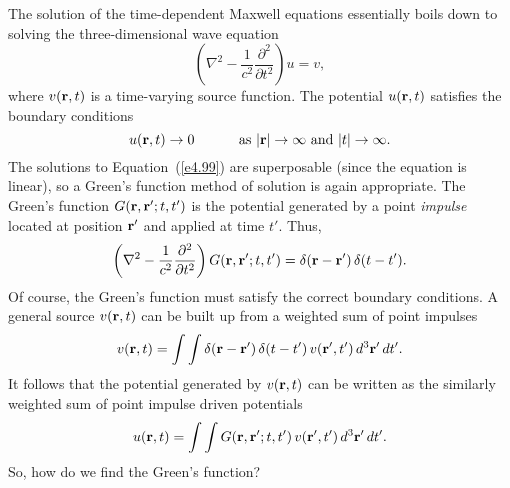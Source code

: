 The solution of the time-dependent Maxwell equations essentially
boils down to solving the three-dimensional wave equation
\begin{equation}\label{e4.99}
\left(\nabla^2 - \frac{1}{c^2}\frac{\partial^2}{\partial t^2}\right)u = v,
\end{equation}
where $v({\bf r}, t)$ is a time-varying source function. The potential $u({\bf r}, t)$
satisfies the boundary conditions
\begin{equation}
u({\bf r},t)\rightarrow 0 \mbox{\hspace{1cm} as $|{\bf r}|\rightarrow\infty$ and $|t|\rightarrow
\infty$.}
\end{equation}
The solutions to Equation~(\ref{e4.99}) are superposable (since the equation is linear), so
a Green's function method of solution is again appropriate. The Green's function
$G({\bf r}, {\bf r}'; t, t')$ is the potential generated by a point {\em impulse}\/ located at
position ${\bf r}'$ and applied at time $t'$. Thus,
\begin{equation}
\left(\nabla^2- \frac{1}{c^2}\frac{\partial^2}{\partial t^2}\right)
 G({\bf r}, {\bf r}'; t, t')= \delta({\bf r} - {\bf r'})\, \delta(t-t').
\end{equation}
Of course, the Green's function must satisfy the correct boundary conditions. A general
source $v({\bf r}, t)$ can be built up from a weighted sum of point impulses
\begin{equation}
v({\bf r}, t) = \int\int \delta({\bf r} - {\bf r'}) \,\delta (t-t')\,v({\bf r}', t')\,
d^3{\bf r}' \,dt'.
\end{equation}
It follows that the potential generated by $v({\bf r}, t)$ can be written as the similarly weighted
sum of point impulse driven potentials
\begin{equation}\label{e4.103}
u({\bf r}, t) = \int\int G({\bf r}, {\bf r}'; t, t')\,v({\bf r}', t')\,
d^3{\bf r}'\,dt'.
\end{equation}
So, how do we find the Green's function?

